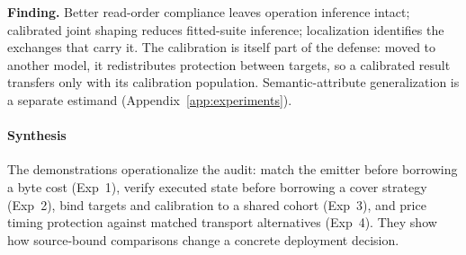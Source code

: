 \textbf{Finding.} Better read-order compliance leaves operation inference intact; calibrated joint shaping reduces fitted-suite inference; localization identifies the exchanges that carry it. The calibration is itself part of the defense: moved to another model, it redistributes protection between targets, so a calibrated result transfers only with its calibration population. Semantic-attribute generalization is a separate estimand (Appendix~\ref{app:experiments}).



\paragraph{Synthesis}
The demonstrations operationalize the audit: match the emitter before borrowing a byte cost (Exp~1), verify executed state before borrowing a cover strategy (Exp~2), bind targets and calibration to a shared cohort (Exp~3), and price timing protection against matched transport alternatives (Exp~4). They show how source-bound comparisons change a concrete deployment decision.

